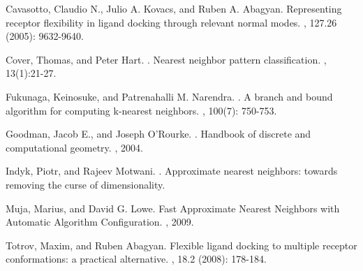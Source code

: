 \documentclass[11pt,letterpaper]{article}
\begin{document}
\begin{thebibliography}{}
 Cavasotto, Claudio N., Julio A. Kovacs, and Ruben A. Abagyan.
\newblock Representing receptor flexibility in ligand docking through relevant normal modes.
, 127.26 (2005): 9632-9640.

 Cover, Thomas, and Peter Hart.
.
\newblock Nearest neighbor pattern classification.
, 13(1):21-27.

 Fukunaga, Keinosuke, and Patrenahalli M. Narendra.
.
\newblock A branch and bound algorithm for computing k-nearest neighbors.
, 100(7): 750-753.

 Goodman, Jacob E., and Joseph O'Rourke.
.
\newblock Handbook of discrete and computational geometry.
, 2004.

 Indyk, Piotr, and Rajeev Motwani.
.
\newblock Approximate nearest neighbors: towards removing the curse of dimensionality.

 Muja, Marius, and David G. Lowe.
\newblock Fast Approximate Nearest Neighbors with Automatic Algorithm Configuration.
, 2009.

 Totrov, Maxim, and Ruben Abagyan.
\newblock Flexible ligand docking to multiple receptor conformations: a practical alternative.
, 18.2 (2008): 178-184.


\end{thebibliography}
\end{document}
